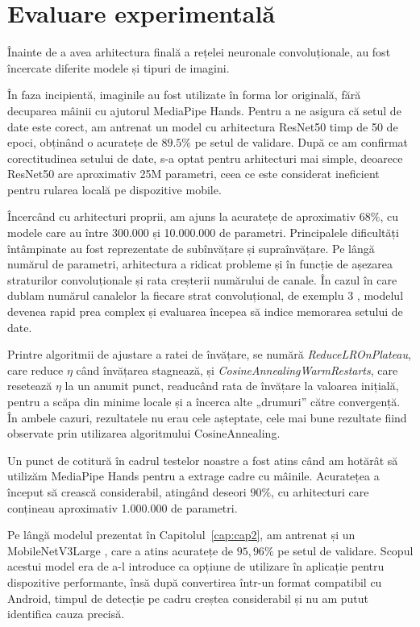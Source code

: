 \section{Evaluare experimentală}

Înainte de a avea arhitectura finală a rețelei neuronale convoluționale, au fost încercate diferite modele și tipuri de imagini.

În faza incipientă, imaginile au fost utilizate în forma lor originală, fără decuparea mâinii cu ajutorul MediaPipe Hands. Pentru a ne asigura că setul de date este corect, am antrenat un model cu arhitectura ResNet50 timp de 50 de epoci, obținând o acuratețe de $89.5\%$ pe setul de validare. După ce am confirmat corectitudinea setului de date, s-a optat pentru arhitecturi mai simple, deoarece ResNet50 are aproximativ 25M parametri, ceea ce este considerat ineficient pentru rularea locală pe dispozitive mobile.

Încercând cu arhitecturi proprii, am ajuns la acuratețe de aproximativ $68\%$, cu modele care au între 300.000 și 10.000.000 de parametri. Principalele dificultăți întâmpinate au fost reprezentate de subînvățare și supraînvățare. Pe lângă numărul de parametri, arhitectura a ridicat probleme și în funcție de așezarea straturilor convoluționale și rata creșterii numărului de canale. În cazul în care dublam numărul canalelor la fiecare strat convoluțional, de exemplu 3 \rightarrow{} \rightarrow{} \rightarrow{} \rightarrow{} \rightarrow{}, modelul devenea rapid prea complex și evaluarea începea să indice memorarea setului de date.

Printre algoritmii de ajustare a ratei de învățare, se numără \textit{ReduceLROnPlateau}, care reduce $\eta$ când învățarea stagnează, și \textit{CosineAnnealingWarmRestarts}, care resetează $\eta$ la un anumit punct, readucând rata de învățare la valoarea inițială, pentru a scăpa din minime locale și a încerca alte „drumuri” către convergență. În ambele cazuri, rezultatele nu erau cele așteptate, cele mai bune rezultate fiind observate prin utilizarea algoritmului CosineAnnealing.

Un punct de cotitură în cadrul testelor noastre a fost atins când am hotărât să utilizăm MediaPipe Hands pentru a extrage cadre cu mâinile. Acuratețea a început să crească considerabil, atingând deseori $90\%$, cu arhitecturi care conțineau aproximativ 1.000.000 de parametri. 

Pe lângă modelul prezentat în Capitolul~\ref{cap:cap2}, am antrenat și un MobileNetV3Large \cite{mobilenetv3}, care a atins acuratețe de $95,96\%$ pe setul de validare. Scopul acestui model era de a-l introduce ca opțiune de utilizare în aplicație pentru dispozitive performante, însă după convertirea într-un format compatibil cu Android, timpul de detecție pe cadru creștea considerabil și nu am putut identifica cauza precisă.

